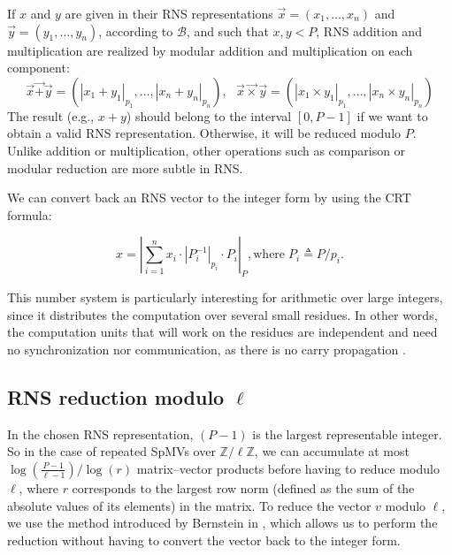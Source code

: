 \documentclass[runningheads,orivec]{llncs}
\begin{document}
If $x$ and $y$ are given in their RNS representations $\vec{x}=(x_1,\dots,x_n)$ and $\vec{y}=(y_1,\dots,y_n)$, according to $\mathcal{B}$, and such that $x,y<P$, RNS addition and multiplication are realized by modular addition and multiplication on each component:
\begin{equation*}
\vec{x}\vec{+}\vec{y} = (|x_1+y_1|_{p_1},\dots,|{x_n}+{y_n}|_{p_n}),\,\,\,\, \vec{x}\vec{\times}\vec{y} = (|x_1\times y_1|_{p_1},\dots, |x_n \times y_n|_{p_n})
\end{equation*}
The result (e.g., $x+y$) should belong to the interval $[0,P-1]$ if we want to obtain a valid RNS representation. Otherwise, it will be reduced modulo $P$. Unlike addition or multiplication, other operations such as comparison or modular reduction are more subtle in RNS.
 
We can convert back an RNS vector to the integer form by using the CRT formula:

\begin{equation}
x = \displaystyle \left|\sum_{i=1}^{n}x_i \cdot \left|{P_i^{-1}}\right|_{p_i}\cdot{P_i} \right|_ {P} \mathrm{, where }\; P_i \triangleq P/p_i.
\nonumber
\end{equation}

This number system is particularly interesting for arithmetic over large integers, since it distributes the computation over several small residues. In other words, the computation units that will work on the residues are independent and need no synchronization nor communication, as there is no carry propagation \cite{TANA67,TAYL84}.

\vspace*{-0.25cm}

\subsection{RNS reduction modulo $\ell$}
\vspace*{-0.25cm}
\label{modular reduction}



In the chosen RNS representation, $(P-1)$ is the largest representable integer. So in the case of repeated SpMVs over $\mathbb{Z}/\ell\mathbb{Z}$, we can accumulate at most $\log(\frac{P-1}{\ell-1})/\log(r)$ matrix--vector products before having to reduce modulo $\ell$, where $r$ corresponds to the largest row norm (defined as the sum of the absolute values of its elements) in the matrix. To reduce the vector $v$ modulo $\ell$, we use the method introduced by Bernstein in \cite{BERN95}, which allows us to perform the reduction without having to convert the vector back to the integer form.
\end{document}

